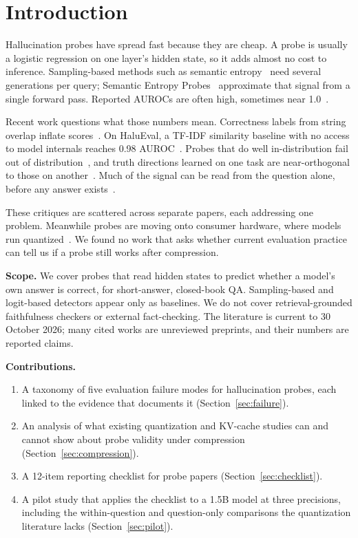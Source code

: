 \documentclass[conference]{IEEEtran}
\begin{document}
\section{Introduction}

Hallucination probes have spread fast because they are cheap. A probe is usually a logistic regression on one layer's hidden state, so it adds almost no cost to inference. Sampling-based methods such as semantic entropy~\cite{farquhar2024semantic} need several generations per query; Semantic Entropy Probes~\cite{kossen2024sep} approximate that signal from a single forward pass. Reported AUROCs are often high, sometimes near 1.0~\cite{aiersilan2026quantized}.

Recent work questions what those numbers mean. Correctness labels from string overlap inflate scores~\cite{illusion2025}. On HaluEval, a TF-IDF similarity baseline with no access to model internals reaches 0.98 AUROC~\cite{hussain2026parallax}. Probes that do well in-distribution fail out of distribution~\cite{ood2025}, and truth directions learned on one task are near-orthogonal to those on another~\cite{orthogonal2025}. Much of the signal can be read from the question alone, before any answer exists~\cite{cencerrado2025noanswer,seo2025aqe}.

These critiques are scattered across separate papers, each addressing one problem. Meanwhile probes are moving onto consumer hardware, where models run quantized~\cite{aiersilan2026quantized}. We found no work that asks whether current evaluation practice can tell us if a probe still works after compression.

\textbf{Scope.} We cover probes that read hidden states to predict whether a model's own answer is correct, for short-answer, closed-book QA. Sampling-based and logit-based detectors appear only as baselines. We do not cover retrieval-grounded faithfulness checkers or external fact-checking. The literature is current to 30 October 2026; many cited works are unreviewed preprints, and their numbers are reported claims.

\textbf{Contributions.}
\begin{enumerate}
\item A taxonomy of five evaluation failure modes for hallucination probes, each linked to the evidence that documents it (Section~\ref{sec:failure}).
\item An analysis of what existing quantization and KV-cache studies can and cannot show about probe validity under compression (Section~\ref{sec:compression}).
\item A 12-item reporting checklist for probe papers (Section~\ref{sec:checklist}).
\item A pilot study that applies the checklist to a 1.5B model at three precisions, including the within-question and question-only comparisons the quantization literature lacks (Section~\ref{sec:pilot}).
\end{enumerate}
\end{document}
